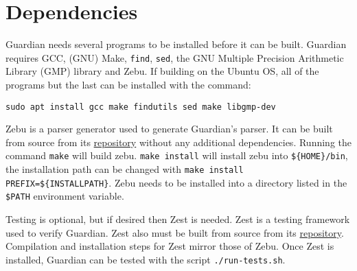 
\section{Dependencies}
{
	Guardian needs several programs to be installed before it can be built.
	Guardian requires GCC, (GNU) Make, \texttt{find},
	\texttt{sed}, the GNU Multiple
	Precision Arithmetic Library (GMP) library and Zebu. If building
	on the Ubuntu OS, all
	of the programs but the last can be installed with the command:
	
	\begin{lstlisting}
sudo apt install gcc make findutils sed make libgmp-dev
	\end{lstlisting}
	
	Zebu is a parser generator used to generate Guardian's parser. It can be
	built from source from its
	\href{https://github.com/ZanderThannhauser/zebu}{repository} without any
	additional dependencies. Running the command \texttt{make} will build zebu.
	\texttt{make install} will install zebu into \texttt{\$\{HOME\}/bin},
	the installation path can be changed with
	\texttt{make install PREFIX=\$\{INSTALLPATH\}}. Zebu needs to be installed
	into a directory listed in the \texttt{\${PATH}} environment variable.
	
	Testing is optional, but if desired then Zest is needed. Zest is a testing
	framework used to verify Guardian. Zest also must
	be built from source from its
	\href{https://github.com/ZanderThannhauser/zest}{repository}.
	Compilation and installation steps for Zest mirror those of Zebu.
	Once Zest is
	installed, Guardian can be tested with the
	script \texttt{./run-tests.sh}.
}



























